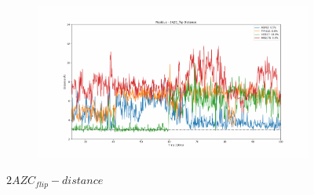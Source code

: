 \documentclass[fleqn,10pt]{wlscirep}
\begin{document}
\begin{figure}[!ht]
\begin{subfigure}{.45\textwidth}
  \end{subfigure}
    \begin{subfigure}{.45\textwidth}
     \centering
     \includegraphics[width=.95\linewidth]{2AZC_flip/2AZC_flip-dist_4.pdf}
  \end{subfigure}
\caption{$2AZC_{flip}-distance$}
\label{sup:2AZC_flip-dist}
\end{figure}
\end{document}
